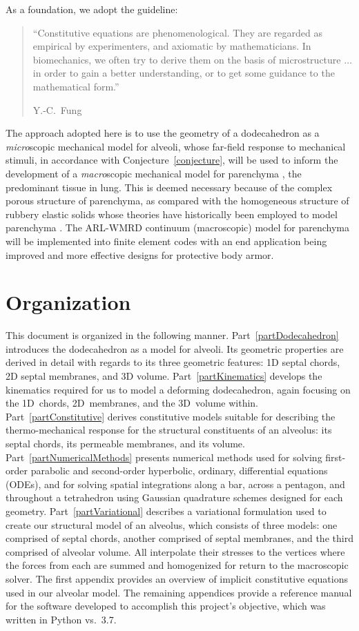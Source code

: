 As a foundation, we adopt the guideline:
\begin{quotation}
	\noindent\small ``Constitutive equations are phenomenological. They are regarded as empirical by experimenters, and axiomatic by mathematicians.  In biomechanics, we often try to derive them on the basis of micro\-structure $\ldots$ in order to gain a better understanding, or to get some guidance to the mathematical form.''
	
	\nopagebreak
	\mbox{} \hfill Y.-C.~Fung \cite[pg.~431]{Fung90} \normalsize
\end{quotation}
The approach adopted here is to use the geometry of a dodecahedron as a \textit{micro\/}scopic mechanical model for alveoli, whose far-field response to mechanical stimuli, in accordance with Conjecture~\ref{conjecture}, will be used to inform the development of a \textit{macro\/}scopic mechanical model for parenchyma \cite{ClaytonFreed19}, the predominant tissue in lung.  This is deemed necessary because of the complex porous structure of parenchyma, as compared with the homo\-geneous structure of rubbery elastic solids whose theories have historically been employed to model parenchyma \cite{Fung75,Fungetal78,Vawteretal79,Fung88}.  The ARL-WMRD continuum (macroscopic) model for parenchyma \cite{ClaytonFreed19} will be implemented into finite element codes with an end application being improved and more effective designs for protective body armor. 

\section{Organization}

This document is organized in the following manner.  Part~\ref{partDodecahedron} introduces the dodecahedron as a model for alveoli.  Its geometric properties are derived in detail with regards to its three geometric features: 1D septal chords, 2D septal membranes, and 3D volume.  Part~\ref{partKinematics} develops the kinematics required for us to model a deforming dodecahedron, again focusing on the 1D~chords, 2D~membranes, and the 3D~volume within.  Part~\ref{partConstitutive} derives constitutive models suitable for describing the thermo-mechanical response for the structural constituents of an alveolus: its septal chords, its permeable membranes, and its volume.  Part~\ref{partNumericalMethods} presents numerical methods used for solving first-order parabolic and second-order hyperbolic, ordinary, differential equations (ODEs), and for solving spatial integrations along a bar, across a pentagon, and throughout a tetrahedron using Gaussian quadrature schemes designed for each geometry.  Part~\ref{partVariational} describes a variational formulation used to create our structural model of an alveolus, which consists of three models: one comprised of septal chords, another comprised of septal membranes, and the third comprised of alveolar volume.  All interpolate their stresses to the vertices where the forces from each are summed and homogenized for return to the macroscopic solver.  The first appendix provides an overview of implicit constitutive equations used in our alveolar model.  The remaining appendices provide a reference manual for the software developed to accomplish this project's objective, which was written in Python vs.~3.7.
